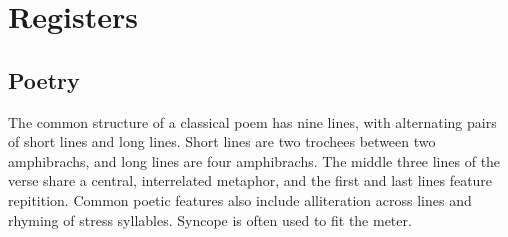 \setchapterpreamble[u]{\margintoc}
\chapter{Registers}
\section{Poetry}
The common structure of a classical \langname{} poem has nine lines, with alternating pairs of short lines and long lines. Short lines are two trochees between two amphibrachs, and long lines are four amphibrachs. The middle three lines of the verse share a central, interrelated metaphor, and the first and last lines feature repitition. Common poetic features also include alliteration across lines and rhyming of stress syllables. Syncope is often used to fit the meter.